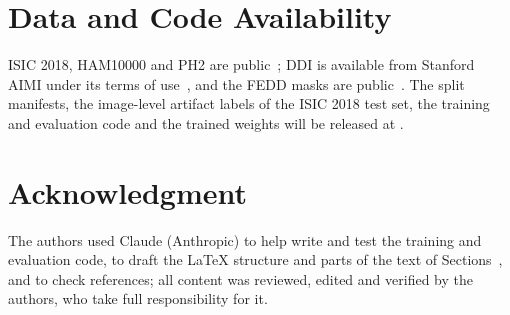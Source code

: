 \section*{Data and Code Availability}
ISIC 2018, HAM10000 and PH2 are public~\cite{codella2019isic2018,tschandl2018ham10000,mendonca2013ph2}; DDI is available from Stanford AIMI under its terms of use~\cite{daneshjou2022ddi}, and the FEDD masks are public~\cite{carrion2023fedd}. The split manifests, the image-level artifact labels of the ISIC 2018 test set, the training and evaluation code and the trained weights will be released at .

\section*{Acknowledgment}
 The authors used Claude (Anthropic) to help write and test the training and evaluation code, to draft the \LaTeX{} structure and parts of the text of Sections~, and to check references; all content was reviewed, edited and verified by the authors, who take full responsibility for it. 
